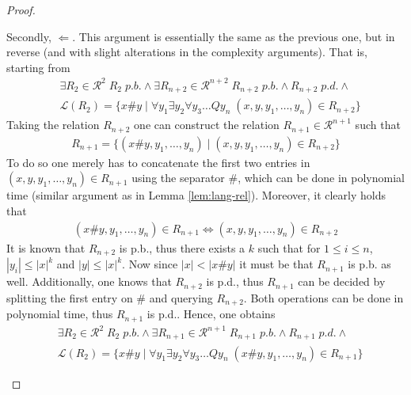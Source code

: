\documentclass [11pt]{article}
\begin{document}
\begin{proof}
\begin{enumerate}
\medskip

Secondly, $\Leftarrow$.  This argument is essentially the same as the previous one, but in reverse (and with slight alterations in the complexity arguments). That is, starting from
 \begin{equation*}
\begin{split}
&\exists R_2 \in \mathcal{R}^{2} \; R_2 \; p.b.  \land  \exists R_{n+2}  \in  \mathcal{R}^{n+2} \; R_{n+2} \; p.b. \land R_{n+2} \; p.d. \land  \\
&\mathcal{L}(R_2) = \{x\#y \mid \forall y_1 \exists y_2\forall y_3\dots Q y_n  \; (x,y,y_1,\ldots,y_n) \in R_{n+2}\} 
\end{split}
\end{equation*}
Taking the relation $R_{n+2}$ one can construct the relation $R_{n+1} \in \mathcal{R}^{n+1}$ such that 
 \begin{equation*}
\begin{split}
 R_{n+1}=\{ (x\#y,y_1,\ldots,y_n) \mid (x,y,y_1,\ldots,y_n) \in R_{n+2}\} 
\end{split}
\end{equation*}
To do so one merely has to concatenate the first two entries in $(x,y,y_1,\ldots,y_n) \in R_{n+1}$ using the separator $\#$, which can be done in polynomial time (similar argument as in Lemma \ref{lem:lang-rel}). Moreover, it clearly holds that
 \begin{equation*}
\begin{split}
(x\#y,y_1,\ldots,y_n) \in R_{n+1} \iff   (x,y,y_1,\ldots,y_n) \in R_{n+2} 
\end{split}
\end{equation*}
It is known that $R_{n+2}$ is p.b., thus there exists a $k$ such that for $1 \leq i \leq n$, $|y_i| \leq |x|^k$ and $|y| \leq |x|^k$. Now since $|x| <|x\#y|$ it must be that $R_{n+1}$ is p.b. as well.
Additionally, one knows that $R_{n+2}$ is p.d., thus $R_{n+1}$ can be decided by splitting the first entry on $\#$ and querying $R_{n+2}$. Both operations can be done in polynomial time, thus $R_{n+1}$ is p.d..
Hence, one obtains 
 \begin{equation*}
\begin{split}
&\exists R_2 \in \mathcal{R}^{2} \; R_2 \; p.b.  \land  \exists R_{n+1}  \in  \mathcal{R}^{n+1} \; R_{n+1} \; p.b. \land R_{n+1} \; p.d. \land  \\
&\mathcal{L}(R_2) = \{x\#y \mid \forall y_1 \exists y_2\forall y_3\dots Q y_n  \; (x\#y,y_1,\ldots,y_n) \in R_{n+1}\} 
\end{split}
\end{equation*}



\end{enumerate}
\end{proof}
\end{document}
